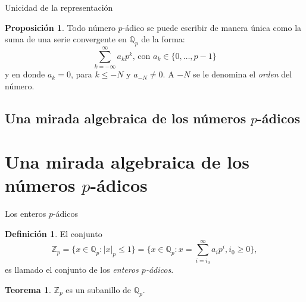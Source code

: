 \documentclass{beamer}
\theoremstyle{definition}
\numberwithin{equation}{section}
\newcommand{\marine}[1]{\textcolor{defColor}{#1}}
\newcommand{\orangee}[1]{\textcolor{thColor}{#1}}
\newtheorem{df}{\marine{Definición}}
\newtheorem{thh}{\orangee{Teorema}}
\newtheorem{pr}{\orangee{Proposición}}
\renewcommand{\geq}{\geqslant}
\renewcommand{\leq}{\leqslant}
\newcommand{\Qp}{\mathbb{Q}_p}
\newcommand{\Zp}{\mathbb{Z}_p}
\DeclareMathOperator{\ord}{Ord}
\begin{document}
\begin{frame}{Unicidad de la representación}
	\begin{pr}
		Todo número $p$-ádico se puede escribir de manera única como la suma de una serie convergente en  $\Qp$ de la forma:
		\begin{equation}
		\sum_{k=-\infty}^{\infty} a_{k} p^{k}\text{, con $a_k\in\{0,\dots,p-1\}$}	\label{eq:1}
		\end{equation}
		y en donde $a_k=0$, para $k\leq - N$ y $a_{-N}\neq 0$\label{ord_def_2}. A $-N$ se le denomina el \textit{orden} del número.
	\end{pr}
\end{frame}

\subsection{Una mirada algebraica de los números $p$-ádicos}
\section*{Una mirada algebraica de los números $p$-ádicos}

\begin{frame}{Los enteros $p$-ádicos}
	\begin{df}
		El conjunto
		\[
		\mathbb{Z}_{p} =\{x\in\Qp:|x|_{p}\leq1\}=\{x\in\Qp:x=\sum_{i=i_{0}}^{\infty} a_{i}p^{i},i_{0}\geq0\},
		\]
		es llamado el conjunto de los \textit{enteros $p$-ádicos}.
	\end{df}
\begin{thh}
	$\Zp$ es un subanillo de $\Qp$.
\end{thh}
\end{frame}
\end{document}
